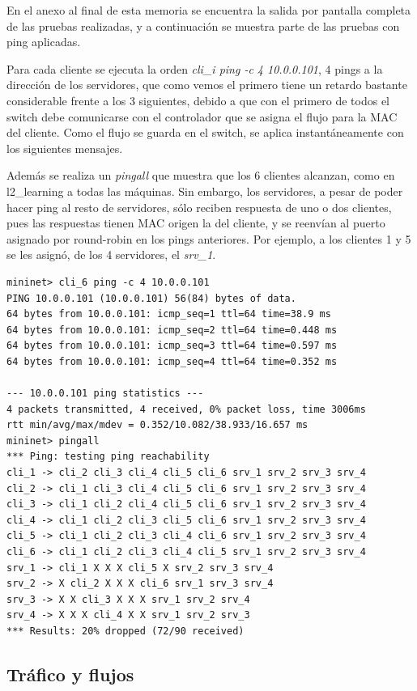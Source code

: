 \documentclass{article}
\begin{document}
En el anexo al final de esta memoria se encuentra la salida por pantalla completa de las pruebas realizadas, y a continuación se muestra parte de las pruebas con ping aplicadas.

Para cada cliente se ejecuta la orden \textit{cli\_i ping -c 4 10.0.0.101}, 4 pings a la dirección de los servidores, que como vemos el primero tiene un retardo bastante considerable frente a los 3 siguientes, debido a que con el primero de todos el switch debe comunicarse con el controlador que se asigna el flujo para la MAC del cliente. Como el flujo se guarda en el switch, se aplica instantáneamente con los siguientes mensajes.

Además se realiza un \textit{pingall} que muestra que los 6 clientes alcanzan, como en l2\_learning a todas las máquinas. Sin embargo, los servidores, a pesar de poder hacer ping al resto de servidores, sólo reciben respuesta de uno o dos clientes, pues las respuestas tienen MAC origen la del cliente, y se reenvían al puerto asignado por round-robin en los pings anteriores. Por ejemplo, a los clientes 1 y 5 se les asignó, de los 4 servidores, el \textit{srv\_1}.

\hfill

\begin{Verbatim}
mininet> cli_6 ping -c 4 10.0.0.101
PING 10.0.0.101 (10.0.0.101) 56(84) bytes of data.
64 bytes from 10.0.0.101: icmp_seq=1 ttl=64 time=38.9 ms
64 bytes from 10.0.0.101: icmp_seq=2 ttl=64 time=0.448 ms
64 bytes from 10.0.0.101: icmp_seq=3 ttl=64 time=0.597 ms
64 bytes from 10.0.0.101: icmp_seq=4 ttl=64 time=0.352 ms

--- 10.0.0.101 ping statistics ---
4 packets transmitted, 4 received, 0% packet loss, time 3006ms
rtt min/avg/max/mdev = 0.352/10.082/38.933/16.657 ms
mininet> pingall
*** Ping: testing ping reachability
cli_1 -> cli_2 cli_3 cli_4 cli_5 cli_6 srv_1 srv_2 srv_3 srv_4
cli_2 -> cli_1 cli_3 cli_4 cli_5 cli_6 srv_1 srv_2 srv_3 srv_4
cli_3 -> cli_1 cli_2 cli_4 cli_5 cli_6 srv_1 srv_2 srv_3 srv_4
cli_4 -> cli_1 cli_2 cli_3 cli_5 cli_6 srv_1 srv_2 srv_3 srv_4
cli_5 -> cli_1 cli_2 cli_3 cli_4 cli_6 srv_1 srv_2 srv_3 srv_4
cli_6 -> cli_1 cli_2 cli_3 cli_4 cli_5 srv_1 srv_2 srv_3 srv_4
srv_1 -> cli_1 X X X cli_5 X srv_2 srv_3 srv_4
srv_2 -> X cli_2 X X X cli_6 srv_1 srv_3 srv_4
srv_3 -> X X cli_3 X X X srv_1 srv_2 srv_4
srv_4 -> X X X cli_4 X X srv_1 srv_2 srv_3
*** Results: 20% dropped (72/90 received)
\end{Verbatim}


\subsection{Tráfico y flujos}
\end{document}
